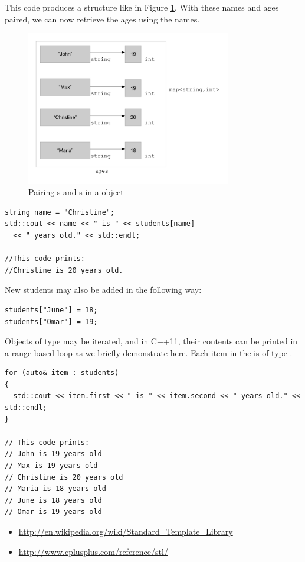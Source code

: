 This code produces a structure like in Figure \ref{fig:STL-map-diagram}. 
With these names and ages paired, we can now retrieve the ages using the names.

\begin{figure}[tb]
  \centering
  \includegraphics[width=0.8\textwidth]{diagrams/STL-map-diagram.pdf}
  \caption{Pairing s and s in a  object} \label{fig:STL-map-diagram} 
\end{figure}

\noindent\begin{minipage}{\linewidth}\begin{lstlisting}
string name = "Christine";
std::cout << name << " is " << students[name] 
  << " years old." << std::endl;

//This code prints:
//Christine is 20 years old.
\end{lstlisting}\end{minipage}

\noindent New students may also be added in the following way:

\noindent\begin{minipage}{\linewidth}\begin{lstlisting}
students["June"] = 18;
students["Omar"] = 19;
\end{lstlisting}\end{minipage}

Objects of type  may be iterated, and in C++11, their contents can be printed in a range-based  loop as we briefly demonstrate here. 
Each item in the  is of type .

\noindent\begin{minipage}{\linewidth}\begin{lstlisting}
for (auto& item : students)
{
  std::cout << item.first << " is " << item.second << " years old." << std::endl;
}

// This code prints:
// John is 19 years old
// Max is 19 years old
// Christine is 20 years old
// Maria is 18 years old
// June is 18 years old
// Omar is 19 years old
\end{lstlisting}\end{minipage}






\begin{itemize}
\item \url{http://en.wikipedia.org/wiki/Standard_Template_Library}
\item \url{http://www.cplusplus.com/reference/stl/}
\end{itemize}	
